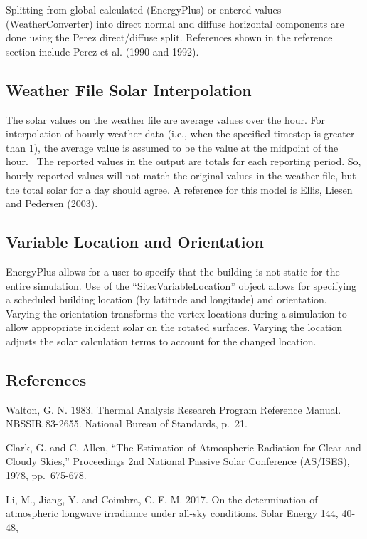 Splitting from global calculated (EnergyPlus) or entered values (WeatherConverter) into direct normal and diffuse horizontal components are done using the Perez direct/diffuse split. References shown in the reference section include Perez et al. (1990 and 1992).

\subsection{Weather File Solar Interpolation}\label{weather-file-solar-interpolation}

The solar values on the weather file are average values over the hour. For interpolation of hourly weather data (i.e., when the specified timestep is greater than 1), the average value is assumed to be the value at the midpoint of the hour.~ The reported values in the output are totals for each reporting period. So, hourly reported values will not match the original values in the weather file, but the total solar for a day should agree. A reference for this model is Ellis, Liesen and Pedersen (2003).

\subsection{Variable Location and Orientation}\label{variable-location-orientation}

EnergyPlus allows for a user to specify that the building is not static for the entire simulation.
Use of the ``Site:VariableLocation'' object allows for specifying a scheduled building location (by latitude and longitude) and orientation.
Varying the orientation transforms the vertex locations during a simulation to allow appropriate incident solar on the rotated surfaces.
Varying the location adjusts the solar calculation terms to account for the changed location.

\subsection{References}\label{references-010}

Walton, G. N. 1983. Thermal Analysis Research Program Reference Manual. NBSSIR 83-2655. National Bureau of Standards, p.~21.

Clark, G. and C. Allen, ``The Estimation of Atmospheric Radiation for Clear and Cloudy Skies,'' Proceedings 2nd National Passive Solar Conference (AS/ISES), 1978, pp.~675-678.

Li, M., Jiang, Y. and Coimbra, C. F. M. 2017. On the determination of atmospheric longwave irradiance under all-sky conditions. Solar Energy 144,  40-48,

